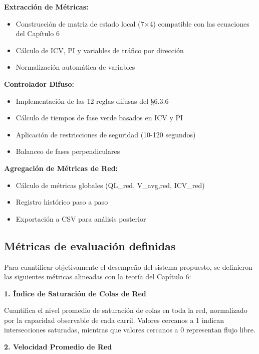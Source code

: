 \documentclass[12pt,a4paper,oneside]{report}
\begin{document}
\textbf{Extracción de Métricas:}

\begin{itemize}
\item
  Construcción de matriz de estado local (7\ensuremath{\times}4) compatible con las ecuaciones del Capítulo 6
\item
  Cálculo de ICV, PI y variables de tráfico por dirección
\item
  Normalización automática de variables
\end{itemize}

\textbf{Controlador Difuso:}

\begin{itemize}
\item
  Implementación de las 12 reglas difusas del §6.3.6
\item
  Cálculo de tiempos de fase verde basados en ICV y PI
\item
  Aplicación de restricciones de seguridad (10-120 segundos)
\item
  Balanceo de fases perpendiculares
\end{itemize}

\textbf{Agregación de Métricas de Red:}

\begin{itemize}
\item
  Cálculo de métricas globales (QL\_red, V\_avg,red, ICV\_red)
\item
  Registro histórico paso a paso
\item
  Exportación a CSV para análisis posterior
\end{itemize}

\subsection{Métricas de evaluación definidas}\label{muxe9tricas-de-evaluaciuxf3n-definidas}

Para cuantificar objetivamente el desempeño del sistema propuesto, se definieron las siguientes métricas alineadas con la teoría del Capítulo 6:

\textbf{1. Índice de Saturación de Colas de Red}

Cuantifica el nivel promedio de saturación de colas en toda la red, normalizado por la capacidad observable de cada carril. Valores cercanos a 1 indican intersecciones saturadas, mientras que valores cercanos a 0 representan flujo libre.

\textbf{2. Velocidad Promedio de Red}
\end{document}
